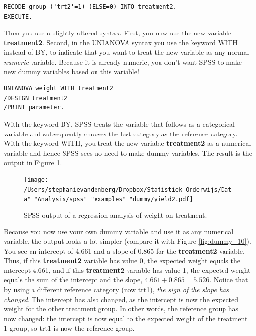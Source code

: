 \documentclass[]{book}\usepackage[]{graphicx}\usepackage[]{color}
\begin{document}
\begin{verbatim}
RECODE group ('trt2'=1) (ELSE=0) INTO treatment2.
EXECUTE.
\end{verbatim}

Then you use a slightly altered syntax. First, you now use the new variable \textbf{treatment2}. Second, in the UNIANOVA syntax you use the keyword WITH instead of BY, to indicate that you want to treat the new variable as any normal \textit{numeric} variable. Because it is already numeric, you don't want SPSS to make new dummy variables based on this variable!

\begin{verbatim}
UNIANOVA weight WITH treatment2 
/DESIGN treatment2
/PRINT parameter.
\end{verbatim}

With the keyword BY, SPSS treats the variable that follows as a categorical variable and subsequently chooses the last category as the reference category. With the keyword WITH, you treat the new variable \textbf{treatment2} as a numerical variable and hence SPSS sees no need to make dummy variables. The result is the output in Figure \ref{fig:dummy_11}.


\begin{figure}[h]
    \begin{center}
       \texttt{[image: /Users/stephanievandenberg/Dropbox/Statistiek\_Onderwijs/Data" "Analysis/spss" "examples" "dummy/yield2.pdf]}
    \end{center}
 \caption{SPSS output of a regression analysis of weight on treatment.}
 \label{fig:dummy_11}
\end{figure}

Because you now use your own dummy variable and use it as any numerical variable, the output looks a lot simpler (compare it with Figure \ref{fig:dummy_10}). You see an intercept of 4.661 and a slope of 0.865 for the \textbf{treatment2} variable. Thus, if this \textbf{treatment2} variable has value 0, the expected weight equals the intercept 4.661, and if this \textbf{treatment2} variable has value 1, the expected weight equals the sum of the intercept and the slope, $4.661 + 0.865 = 5.526$. Notice that by using a different reference category (now trt1), \textit{the sign of the slope has changed}. The intercept has also changed, as the intercept is now the expected weight for the other treatment group. In other words, the reference group has now changed: the intercept is now equal to the expected weight of the treatment 1 group, so trt1 is now the reference group.
\end{document}

